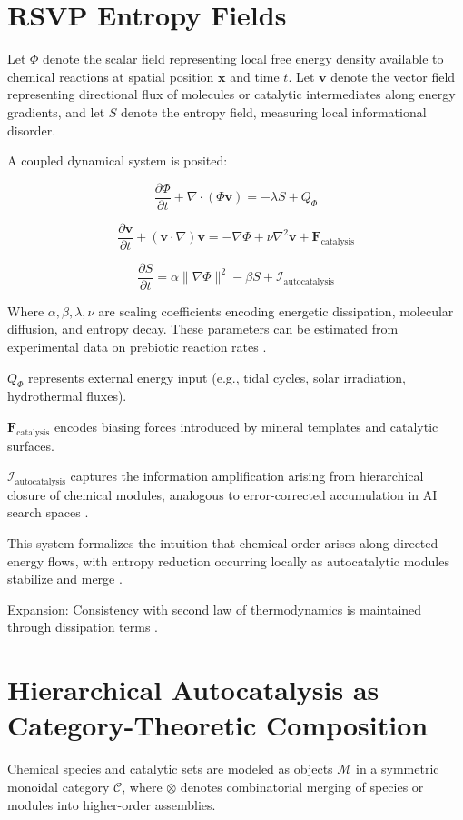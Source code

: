 \documentclass[openany]{book}
\begin{document}
\section{RSVP Entropy Fields}
Let $\Phi$ denote the scalar field representing local free energy density available to chemical reactions at spatial position $\mathbf{x}$ and time $t$. Let $\mathbf{v}$ denote the vector field representing directional flux of molecules or catalytic intermediates along energy gradients, and let $S$ denote the entropy field, measuring local informational disorder.

A coupled dynamical system is posited:

\[\frac{\partial \Phi}{\partial t} + \nabla \cdot (\Phi \mathbf{v}) = - \lambda S + Q_\Phi\]

\[\frac{\partial \mathbf{v}}{\partial t} + (\mathbf{v} \cdot \nabla) \mathbf{v} = - \nabla \Phi + \nu \nabla^2 \mathbf{v} + \mathbf{F}_{\text{catalysis}}\]

\[\frac{\partial S}{\partial t} = \alpha \|\nabla \Phi\|^2 - \beta S + \mathcal{I}_{\text{autocatalysis}}\]

Where $\alpha, \beta, \lambda, \nu$ are scaling coefficients encoding energetic dissipation, molecular diffusion, and entropy decay. These parameters can be estimated from experimental data on prebiotic reaction rates \citep{sokolskyi2024, matreux2024}.

$Q_\Phi$ represents external energy input (e.g., tidal cycles, solar irradiation, hydrothermal fluxes).

$\mathbf{F}_{\text{catalysis}}$ encodes biasing forces introduced by mineral templates and catalytic surfaces.

$\mathcal{I}_{\text{autocatalysis}}$ captures the information amplification arising from hierarchical closure of chemical modules, analogous to error-corrected accumulation in AI search spaces \citep{scalinghypothesis}.

This system formalizes the intuition that chemical order arises along directed energy flows, with entropy reduction occurring locally as autocatalytic modules stabilize and merge \citep{peng2022}.

Expansion: Consistency with second law of thermodynamics is maintained through dissipation terms \citep{prigogine1984}.

\section{Hierarchical Autocatalysis as Category-Theoretic Composition}
Chemical species and catalytic sets are modeled as objects $\mathcal{M}$ in a symmetric monoidal category $\mathcal{C}$, where $\otimes$ denotes combinatorial merging of species or modules into higher-order assemblies.
\end{document}
